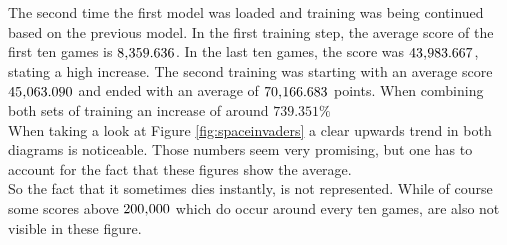 \documentclass[12pt]{article}
\begin{document}
The second time the first model was loaded and training was being continued based on the previous model. In the first training step, the average score of the first ten games is $8\textsc{\char13}359.636$. In the last ten games, the score was $43\textsc{\char13}983.667$, stating a high increase. 
The second training was starting with an average score $45\textsc{\char13}063.090$ and ended with an average of $70\textsc{\char13}166.683$ points. When combining both sets of training an increase of around $739.351\%$ \\
When taking a look at Figure \ref{fig:spaceinvaders} a clear upwards trend in both diagrams is noticeable. Those numbers seem very promising, but one has to account for the fact that these figures show the average. \\
So the fact that it sometimes dies instantly, is not represented. While of course some scores above $200\textsc{\char13}000$ which do occur around every ten games, are also not visible in these figure. 
\end{document}
